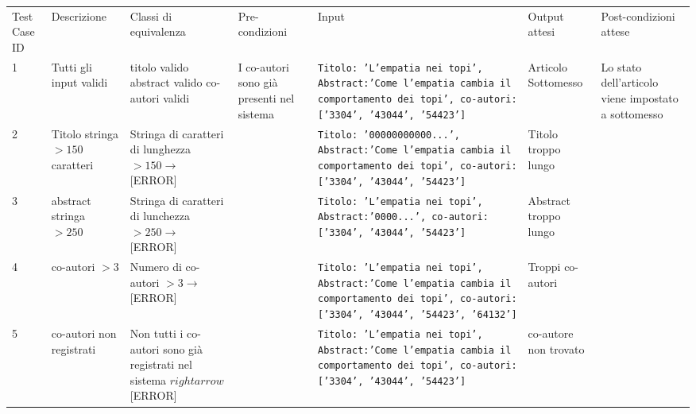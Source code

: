 \begin{sidewaystable}
  \small
  \centering
  \begin{tabular}{|p{2cm}|p{3cm}|p{3cm}|p{3cm}|p{3cm}|p{3cm}|p{2.5cm}|}
    \hline
    \rowcolor{SkyBlue}
    \multicolumn{7}{l}{Test Suite: Sottomissione di un articolo}\\
    \hline
    \hline
    Test Case ID & Descrizione & Classi di equivalenza & Pre\hyp{}condizioni & Input & Output attesi & Post\hyp{}condizioni attese \\
    \hline
    1 & Tutti gli input validi & titolo valido abstract valido co-autori validi & I co\hyp{}autori sono già presenti nel sistema & \texttt{Titolo: 'L'empatia nei topi', Abstract:'Come l'empatia cambia il comportamento dei topi', co-autori: ['3304', '43044', '54423']}& Articolo Sottomesso & Lo stato dell'articolo viene impostato a sottomesso \\
    \hline
    2 & Titolo stringa \(>150\) caratteri & Stringa di caratteri di lunghezza \(> 150 \rightarrow\) [ERROR]  & & \texttt{Titolo: '00000000000...', Abstract:'Come l'empatia cambia il comportamento dei topi', co-autori: ['3304', '43044', '54423']} & Titolo troppo lungo & \\
    \hline
    3 & abstract stringa \(> 250\) & Stringa di caratteri di lunchezza \(> 250 \rightarrow\) [ERROR] & &  \texttt{Titolo: 'L'empatia nei topi', Abstract:'0000...', co-autori: ['3304', '43044', '54423']} & Abstract troppo lungo & \\
    \hline
    4 & co\hyp{}autori \(> 3\) & Numero di co-autori \(> 3 \rightarrow\) [ERROR] & &\texttt{Titolo: 'L'empatia nei topi', Abstract:'Come l'empatia cambia il comportamento dei topi', co-autori: ['3304', '43044', '54423', '64132']} & Troppi co\hyp{}autori & \\
    \hline
    5 & co\hyp{}autori non registrati & Non tutti i co-autori sono già registrati nel sistema \(rightarrow\) [ERROR]  & &\texttt{Titolo: 'L'empatia nei topi', Abstract:'Come l'empatia cambia il comportamento dei topi', co-autori: ['3304', '43044', '54423']} & co\hyp{}autore non trovato & \\
    \hline
  \end{tabular}
\end{sidewaystable}

